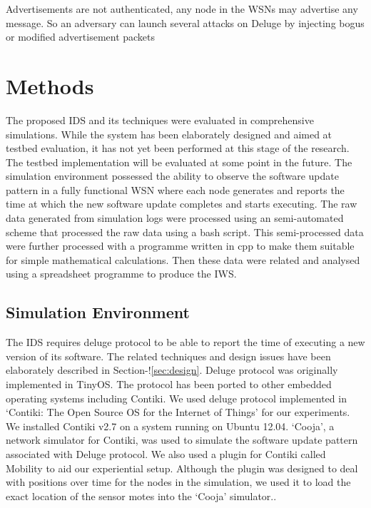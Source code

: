 \documentclass[conference,final]{IEEEtran}
\begin{document}
Advertisements are not authenticated, any node in the WSNs may advertise any message. So an adversary can 
launch several attacks on Deluge by injecting bogus or modified advertisement packets 




\section{Methods}
\label{sec:meth}

The proposed IDS and its techniques were evaluated in comprehensive simulations.
While the system has been elaborately designed and aimed at testbed evaluation, it has not yet been performed at this stage of the research. 
The testbed implementation will be evaluated at some point in the future.
The simulation environment possessed the ability to observe the software update pattern in a fully functional WSN where each node generates and reports the time at which the new software update completes and starts executing.
The raw data generated from simulation logs were processed using an semi-automated scheme that processed the raw data using a bash script.
This semi-processed data were further processed with a programme written in cpp to make them suitable for simple mathematical calculations.
Then these data were related and  analysed using a spreadsheet programme to produce the IWS.


\subsection*{Simulation Environment}
\label{subsec:sim_env}
The IDS requires deluge protocol to be able to report the time of executing  a new version of its software.
The related techniques and design issues have been elaborately described in Section-!\ref{sec:design}.
Deluge protocol was originally implemented in TinyOS.
The protocol has been ported to other embedded operating systems including Contiki.
We used deluge protocol implemented in `Contiki: The Open Source OS for the Internet of Things' for our experiments. 
We installed Contiki v2.7 on a system running on Ubuntu 12.04.
`Cooja', a network simulator for Contiki, was used to simulate the software update pattern associated with Deluge protocol. 
We also used a plugin for Contiki called Mobility to aid our experiential setup.
Although the plugin was designed to deal with positions over time for the nodes in the simulation, we used it to load the exact location of the sensor motes into the `Cooja' simulator.. 
\end{document}
